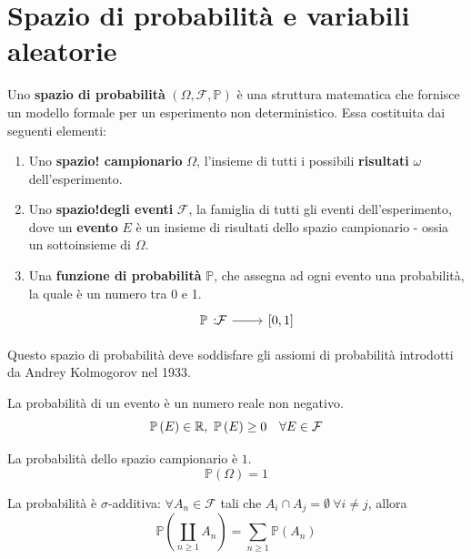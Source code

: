 \section{Spazio di probabilità e variabili aleatorie}
\begin{define}
	Uno \textbf{spazio di probabilità} $\left(\Omega,\mathcal{F},\mathbb{P}\right)$ è una struttura matematica che fornisce un modello formale per un esperimento non deterministico. Essa costituita dai seguenti elementi:
	\begin{enumerate}
		\item Uno \textbf{spazio! campionario} $\Omega$, l'insieme di tutti i possibili \textbf{risultati} $\omega$ dell'esperimento.
		\item Uno \textbf{spazio!degli eventi} $\mathcal{F}$, la famiglia di tutti gli eventi dell'esperimento, dove un \textbf{evento} $E$ è un insieme di risultati dello spazio campionario - ossia un sottoinsieme di $\Omega$.
		\item Una \textbf{funzione di probabilità} $\mathbb{P}$, che assegna ad ogni evento una probabilità, la quale è un numero tra 0 e 1.
		\begin{equation}
			\funz{\mathbb{P}}{\mathcal{F}}{\left[0,1\right]}
		\end{equation}
	\end{enumerate}
\end{define}
Questo spazio di probabilità deve soddisfare gli assiomi di probabilità introdotti da Andrey Kolmogorov nel 1933.
\begin{axiom}
	La probabilità di un evento è un numero reale non negativo.
	\begin{equation}
		\mathbb{P}\left(E\right)\in\realset,\ \mathbb{P}\left(E\right)\geq 0\quad \forall E\in\mathcal{F} 
	\end{equation}
\end{axiom}
\begin{axiom}
	La probabilità dello spazio campionario è $1$.
	\begin{equation}
		\mathbb{P}\left(\Omega\right)=1
	\end{equation}
\end{axiom}
\begin{axiom}
	La probabilità è $\sigma$-additiva:	$\forall A_n\in\mathcal{F}$ tali che $A_i\cap A_j=\emptyset\ \forall i\neq j$, allora
	\begin{equation}
		\mathbb{P}\left(\coprod_{n\geq 1}A_n\right)=\sum_{n\geq 1}\mathbb{P}\left(A_n\right)
	\end{equation}
\end{axiom}
